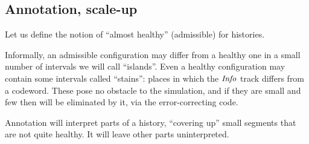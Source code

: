 \documentclass[11pt]{memoir}
\theoremstyle{definition} %
\newcommand{\fld}[1]{\ensuremath{\textit{#1\/}}}
\newcommand{\Tu}{T}
\newcommand{\Tus}{T^{*}}
\newcommand{\Info}{\fld{Info}}
\begin{document}
\subsection{Annotation, scale-up}\label{sec:annotation}

Let us define the notion of ``almost healthy'' (admissible) for histories.

Informally, an admissible configuration may differ from a healthy one in a small number
of intervals we will call ``islands''.
Even a healthy configuration may contain some intervals called ``stains'':
places in which the \( \Info \) track differs from a codeword.
These pose no obstacle to the simulation, and if they are small and few then
will be eliminated by it, via the error-correcting code.

Annotation will interpret parts of a history, ``covering up''
small segments that are not quite healthy.
It will leave other parts uninterpreted.

\end{document}
